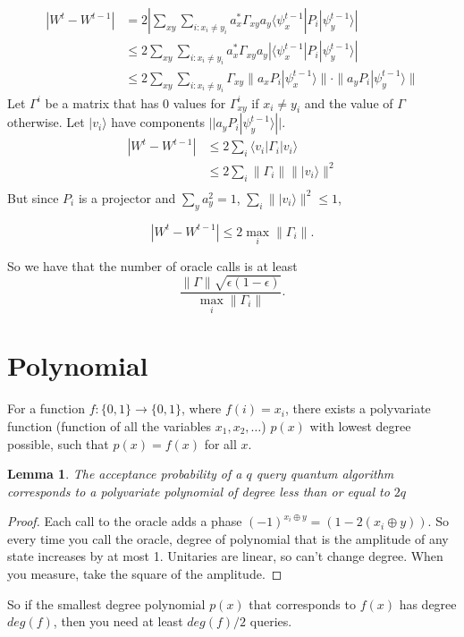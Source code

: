 \documentclass[12pt]{article}
\newtheorem{lemma}[theorem]{Lemma}
\begin{document}
\begin{align}
|W^t-W^{t-1}|&=2|\sum_{xy}\sum_{i:x_i\neq y_i}a_x^*\Gamma_{xy} a_y\langle\psi_x^{t-1}|P_i|\psi_y^{t-1}\rangle|\\
&\leq 2\sum_{xy}\sum_{i:x_i\neq y_i}a_x^*\Gamma_{xy} a_y|\langle\psi_x^{t-1}|P_i|\psi_y^{t-1}\rangle|\\
&\leq 2\sum_{xy}\sum_{i:x_i\neq y_i}\Gamma_{xy} \|a_xP_i|\psi_x^{t-1}\rangle\|\cdot\|a_yP_i|\psi_y^{t-1}\rangle\|
\end{align}
Let $\Gamma^i$ be a matrix that has 0 values for $\Gamma^i_{xy}$ if $x_i\neq y_i$ and the value of $\Gamma$ otherwise. Let
$|v_i\rangle$ have components $||a_yP_i|\psi_y^{t-1}\rangle||$.
\begin{align}
|W^t-W^{t-1}|&\leq 2\sum_{i}\langle v_i |\Gamma_i |v_i\rangle \\
&\leq 2\sum_{i}\|\Gamma_i\| \| |v_i\rangle\|^2 \\
\end{align}
But since $P_i$ is a projector and $\sum_y a_y^2=1$, $\sum_i\| |v_i\rangle\|^2\leq 1$,

$$|W^t-W^{t-1}|\leq 2\max_i \|\Gamma_i\|.$$

So we have that the number of oracle calls is at least 
$$\frac{\|\Gamma\|\sqrt{\epsilon(1-\epsilon)}}{\max_i \|\Gamma_i\|}.$$




\section{Polynomial}
For a function $f:\{0,1\}\rightarrow\{0,1\}$, where $f(i)=x_i$, there exists a polyvariate function (function of all the variables $x_1,x_2,\dots$)  $p(x)$ with lowest degree possible, such that $p(x)=f(x)$ for all $x$.
\begin{lemma}
The acceptance probability of  a $q$ query quantum algorithm corresponds to a polyvariate polynomial of degree less than or equal to $2q$
\end{lemma}
\begin{proof}
Each call to the oracle adds a phase $(-1)^{x_i\oplus y}=(1-2(x_i\oplus y))$. So every time you call the oracle, degree of polynomial that is the amplitude of any state increases by at most 1. Unitaries are linear, so can't change degree. When you measure, take the square of the amplitude.
\end{proof}
So if the smallest degree polynomial $p(x)$ that corresponds to $f(x)$ has degree $deg(f)$, then you need at least $deg(f)/2$ queries. 
\end{document}
